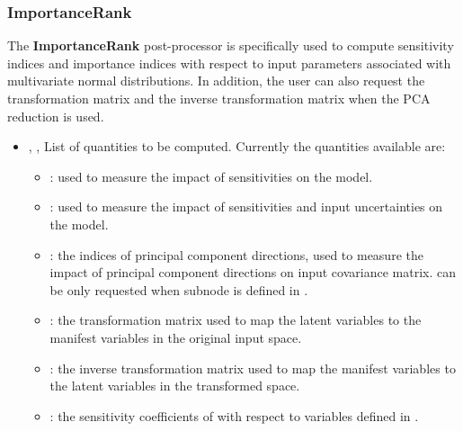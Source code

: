 \subsubsection{ImportanceRank}
\label{ImportanceRank}
The \textbf{ImportanceRank} post-processor is specifically used
to compute sensitivity indices and importance indices with respect to input parameters
associated with multivariate normal distributions. In addition, the user can also request the transformation
matrix and the inverse transformation matrix when the PCA reduction is used.
%
%
\begin{itemize}
  \item {}, ,
  List of quantities to be computed.
  Currently the quantities available are:
  \begin{itemize}
    \item {}: used to measure the impact of sensitivities on the model.
    \item {}: used to measure the impact of sensitivities and input uncertainties on the model.
    \item {}: the indices of principal component directions, used to measure the impact
    of principal component directions on input covariance matrix.
    \nb {} can be only requested when subnode  is defined in .
    \item {}: the transformation matrix used to map the latent variables to the manifest variables in the original input space.
    \item {}: the inverse transformation matrix used to map the manifest variables to the latent variables in the transformed space.
    \item {}: the sensitivity coefficients of  with respect to  variables defined in .


\end{itemize}
\end{itemize}

